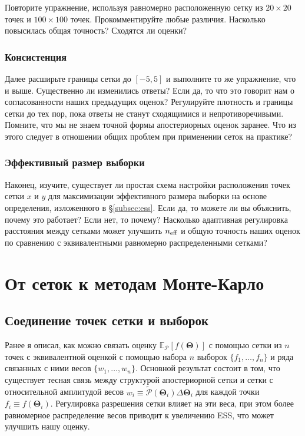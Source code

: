 \documentclass[12pt, titlepage]{article}
\newcommand{\meanwrt}[2]{\ensuremath{\mathbb{E}_{{#2}}\left[{#1}\right]}}
\newcommand{\params}{\ensuremath{\boldsymbol\Theta}}
\newcommand{\posterior}{\ensuremath{\mathcal{P}}}
\begin{document}
Повторите упражнение, используя равномерно расположенную сетку из $20 \times 20$ точек и $100 \times 100$ точек. Прокомментируйте любые различия. Насколько повысилась общая точность? Сходятся ли оценки?

\subsubsection*{Консистенция}

Далее расширьте границы сетки до $[-5, 5]$ и выполните то же упражнение, что и выше. Существенно ли изменились ответы? Если да, то что это говорит нам о согласованности наших предыдущих оценок? Регулируйте плотность и границы сетки до тех пор, пока ответы не станут сходящимися и непротиворечивыми. Помните, что мы не знаем точной формы апостериорных оценок заранее. Что из этого следует в отношении общих проблем при применении сеток на практике?

\subsubsection*{Эффективный размер выборки}

Наконец, изучите, существует ли простая схема настройки расположения точек сетки $x$ и $y$ для максимизации эффективного размера выборки на основе определения, изложенного в \S\ref{subsec:ess}. Если да, то можете ли вы объяснить, почему это работает? Если нет, то почему? Насколько адаптивная регулировка расстояния между сетками может улучшить $n_{\rm eff}$ и общую точность наших оценок по сравнению с эквивалентными равномерно распределенными сетками?

\section{От сеток к методам Монте-Карло} \label{sec:montecarlo}

\subsection{Соединение точек сетки и выборок}
\label{subsec:grid_to_samp}

Ранее я описал, как можно связать оценку $\meanwrt{f(\params)}{\posterior}$ с помощью сетки из $n$ точек с эквивалентной оценкой с помощью набора $n$ выборок $\{ f_1, \dots, f_n\}$ и ряда связанных с ними весов $\{ w_1, \dots, w_n \}$. Основной результат состоит в том, что существует тесная связь между структурой апостериорной сетки и сетки с относительной амплитудой весов $w_i \equiv \tilde{\posterior}(\params_i)\Delta\params_i$ для каждой точки $f_i \equiv f(\params_i)$. Регулировка разрешения сетки влияет на эти веса, при этом более равномерное распределение весов приводит к увеличению ESS, что может улучшить нашу оценку.
\end{document}
